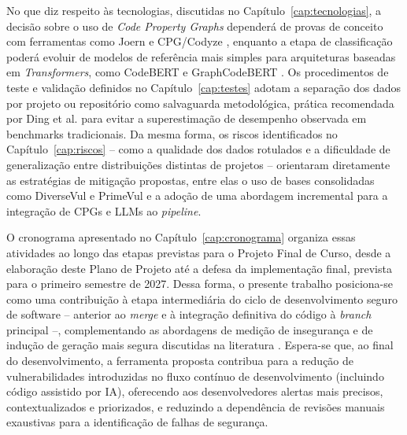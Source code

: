 No que diz respeito às tecnologias, discutidas no
Capítulo~\ref{cap:tecnologias}, a decisão sobre o uso de
\textit{Code Property Graphs} dependerá de provas de conceito com
ferramentas como Joern e CPG/Codyze \cite{yamaguchi2014cpg}, enquanto a
etapa de classificação poderá evoluir de modelos de referência mais
simples para arquiteturas baseadas em \textit{Transformers}, como
CodeBERT e GraphCodeBERT \cite{feng2020codebert,guo2021graphcodebert}. Os
procedimentos de teste e validação definidos no
Capítulo~\ref{cap:testes} adotam a separação dos dados por projeto ou
repositório como salvaguarda metodológica, prática recomendada por Ding
et al. \cite{ding2024primevul} para evitar a superestimação de
desempenho observada em benchmarks tradicionais. Da mesma forma, os
riscos identificados no Capítulo~\ref{cap:riscos} -- como a qualidade
dos dados rotulados e a dificuldade de generalização entre distribuições
distintas de projetos \cite{chen2023diversevul,ding2024primevul,outofdistribution2025} -- orientaram diretamente as estratégias de
mitigação propostas, entre elas o uso de bases consolidadas como
DiverseVul e PrimeVul e a adoção de uma abordagem incremental para a
integração de CPGs e LLMs ao \textit{pipeline}.

O cronograma apresentado no Capítulo~\ref{cap:cronograma} organiza essas
atividades ao longo das etapas previstas para o Projeto Final de Curso,
desde a elaboração deste Plano de Projeto até a defesa da implementação
final, prevista para o primeiro semestre de 2027. Dessa forma, o
presente trabalho posiciona-se como uma contribuição à etapa
intermediária do ciclo de desenvolvimento seguro de software --
anterior ao \textit{merge} e à integração definitiva do código à \textit{branch} principal --, complementando as
abordagens de medição de insegurança e de indução de geração mais
segura discutidas na literatura \cite{liu2025securecodegen,wu2025}.
Espera-se que, ao final do desenvolvimento, a ferramenta proposta
contribua para a redução de vulnerabilidades introduzidas no fluxo contínuo de desenvolvimento (incluindo código assistido por IA), oferecendo aos desenvolvedores alertas mais
precisos, contextualizados e priorizados, e reduzindo a dependência de
revisões manuais exaustivas para a identificação de falhas de
segurança.

